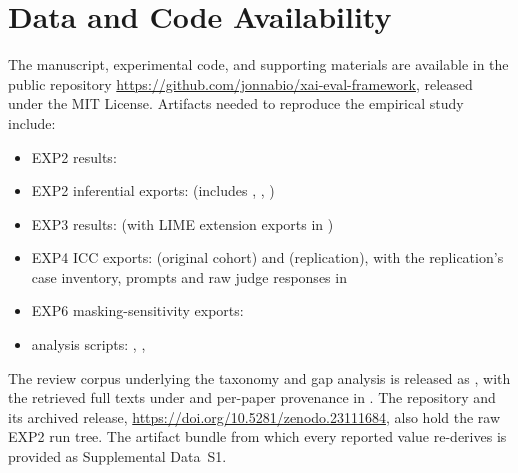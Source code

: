 \documentclass[fleqn,10pt,lineno]{wlpeerj}
\newcommand{\zenodoversiondoi}{\url{https://doi.org/10.5281/zenodo.23111684}}
\begin{document}
\section*{Data and Code Availability}
\label{sec:artifacts}

The manuscript, experimental code, and supporting materials are available
in the public repository
\url{https://github.com/jonnabio/xai-eval-framework}, released under the MIT License. Artifacts needed to reproduce the empirical study include:
\begin{sloppypar}
\begin{itemize}[leftmargin=*]
\item EXP2 results: 
\item EXP2 inferential exports: 
(includes ,
,
)
\item EXP3 results: 
(with LIME extension exports in )
\item EXP4 ICC exports: 
(original cohort) and  (replication),
with the replication's case inventory, prompts and raw judge responses in
\item EXP6 masking-sensitivity exports:
\item analysis scripts: ,
,
\end{itemize}
\end{sloppypar}

The review corpus underlying the taxonomy and gap analysis is released as
, with the retrieved
full texts under  and per-paper
provenance in .
The repository and its archived release,
\zenodoversiondoi{}, also hold the raw EXP2 run
tree.
The artifact bundle from which every reported value re-derives is
provided as Supplemental Data~S1.
\end{document}
